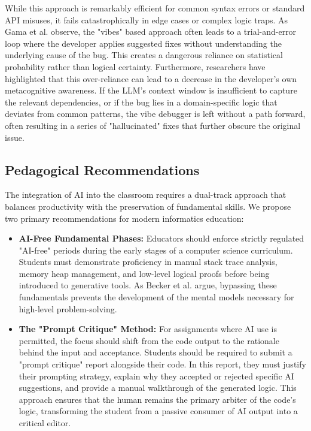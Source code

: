 \documentclass[../main.tex]{subfiles}
\begin{document}
While this approach is remarkably efficient for common syntax errors or standard API misuses, it fails catastrophically in edge cases or complex logic traps. As Gama et al. \cite{gama2025can} observe, the "vibes" based approach often leads to a trial-and-error loop where the developer applies suggested fixes without understanding the underlying cause of the bug. This creates a dangerous reliance on statistical probability rather than logical certainty. Furthermore, researchers have highlighted that this over-reliance can lead to a decrease in the developer's own metacognitive awareness. \cite{tankelevitch2024metacognitive} If the LLM’s context window is insufficient to capture the relevant dependencies, or if the bug lies in a domain-specific logic that deviates from common patterns, the vibe debugger is left without a path forward, often resulting in a series of "hallucinated" fixes that further obscure the original issue.

\subsection{Pedagogical Recommendations}

The integration of AI into the classroom requires a dual-track approach that balances productivity with the preservation of fundamental skills. We propose two primary recommendations for modern informatics education:

\begin{itemize}
    \item \textbf{AI-Free Fundamental Phases:} 
          Educators should enforce strictly regulated "AI-free" periods during the early stages of a computer science curriculum. 
          Students must demonstrate proficiency in manual stack trace analysis, memory heap management, and low-level logical proofs before being introduced to generative tools. 
          As Becker et al. \cite{becker2023programming} argue, bypassing these fundamentals prevents the development of the mental models necessary for high-level problem-solving.
    
    \item \textbf{The "Prompt Critique" Method:} 
          For assignments where AI use is permitted, the focus should shift from the code output to the rationale behind the input and acceptance. 
          Students should be required to submit a "prompt critique" report alongside their code. 
          In this report, they must justify their prompting strategy, explain why they accepted or rejected specific AI suggestions, and provide a manual walkthrough of the generated logic. 
          This approach ensures that the human remains the primary arbiter of the code's logic, transforming the student from a passive consumer of AI output into a critical editor. \cite{bucinca2021trust}
\end{itemize}
\end{document}
